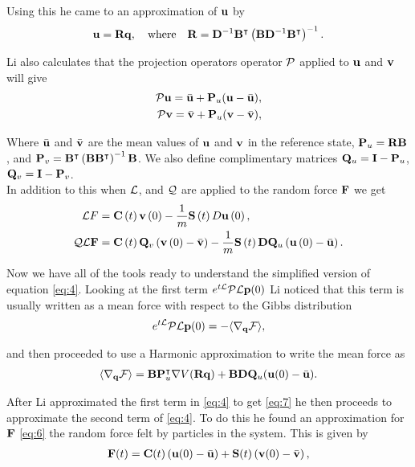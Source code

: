 Using this he came to an approximation of $\mathbf{u}$ by
\begin{align}
\mathbf{u} = \mathbf{R}\mathbf{q}, \quad \text{where} \quad
 \mathbf{R} = \mathbf{D}^{-1}\mathbf{B}^{\intercal}\left(\mathbf{B}\mathbf{D}^{-1}\mathbf{B}^{\intercal}\right)^{-1}.
\end{align}

Li also calculates that the projection operators operator $\mathbf{\mathcal{P}}$ applied to $\mathbf{u}$ and $\mathbf{v}$ will give 
\begin{align}
\mathbf{\mathcal{P}}\mathbf{u} = \bar{\mathbf{u}} + \mathbf{P}_u(\mathbf{u}-\bar{\mathbf{u}}),\\
\mathbf{\mathcal{P}}\mathbf{v} = \bar{\mathbf{v}} + \mathbf{P}_u(\mathbf{v}-\bar{\mathbf{v}}),
\end{align}

Where $\bar{\mathbf{u}}$ and $\bar{\mathbf{v}}$ are the mean values of $\mathbf{u}$ and $\mathbf{v}$ in the reference state, $\mathbf{P}_u = \mathbf{R}\mathbf{B}$, and $\mathbf{P}_v = \mathbf{B}^{\intercal}\left(\mathbf{B}\mathbf{B}^{\intercal}\right)^{-1}\mathbf{B}$. We also define complimentary matrices $\mathbf{Q}_u = \mathbf{I} - \mathbf{P}_u$, $\mathbf{Q}_v = \mathbf{I} - \mathbf{P}_v$.\\

In addition to this when $\mathbf{\mathcal{L}}$, and $\mathbf{\mathcal{Q}}$ are applied to the random force $\mathbf{F}$ we get
\begin{align}
\mathbf{\mathcal{L}} F & = \mathbf{C} \left( t \right) \mathbf{v}\left( 0 \right) - \frac{1}{m}\mathbf{S} \left( t \right)D\mathbf{u}\left( 0 \right),\label{eq:a1}\\
\mathbf{\mathcal{Q}}\mathbf{\mathcal{L}}\mathbf{F} & = \mathbf{C}\left( t \right)\mathbf{Q}_v \left( \mathbf{v}\left( 0 \right) - \bar{\mathbf{v}}\right) - \frac{1}{m}\mathbf{S}\left( t \right)\mathbf{D}\mathbf{Q}_u \left( \mathbf{u}\left( 0 \right) - \bar{\mathbf{u}} \right). \label{eq:a2}
\end{align}


Now we have all of the tools ready to understand the simplified version of equation \eqref{eq:4}. Looking at the first term $e^{t\mathbf{\mathcal{L}}}\mathbf{\mathcal{P}}\mathbf{\mathcal{L}}\mathbf{p}(0)$ Li noticed that this term is usually written as a mean force with respect to the Gibbs distribution
\begin{align*}
e^{t\mathbf{\mathcal{L}}}\mathbf{\mathcal{P}}\mathbf{\mathcal{L}}\mathbf{p}(0)=-\langle\nabla_{\mathbf{q}}\mathcal{F}\rangle,
\end{align*}
  
 and then proceeded to use a Harmonic approximation to write the mean force as
 \begin{align}
 \langle\nabla_{\mathbf{q}}\mathcal{F}\rangle = \mathbf{B}\mathbf{P}_u^{\intercal}\nabla V(\mathbf{R}\mathbf{q})+\mathbf{B}\mathbf{D}\mathbf{Q}_u(\mathbf{u}(0)-\bar{\mathbf{u}}).\label{eq:7}
 \end{align}
 
After Li approximated the first term in \eqref{eq:4} to get \eqref{eq:7} he then proceeds to approximate the second term of \eqref{eq:4}. To do this he found an approximation for $\mathbf{F}$ \eqref{eq:6} the random force felt by particles in the system.  This is given by 
\begin{align}
\mathbf{F}(t) = \mathbf{C}(t)\left( \mathbf{u}(0)-\bar{\mathbf{u}}\right) + \mathbf{S}(t) \left( \mathbf{v}(0) - \bar{\mathbf{v}}\right),
\end{align}

